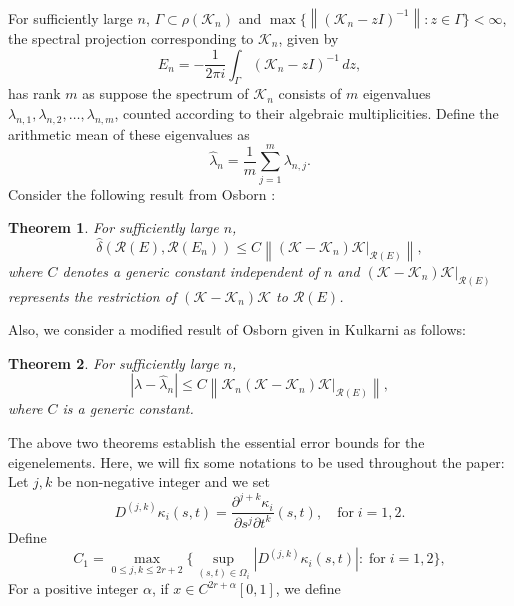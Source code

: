 \documentclass[pdflatex, sn-mathphys-num]{sn-jnl}%
\newcommand{\norm}[1]{\left\lVert #1\right\rVert}
\theoremstyle{thmstyleone}%
\newtheorem{theorem}{Theorem}[section]
\theoremstyle{thmstyletwo}%
\theoremstyle{thmstylethree}%
\begin{document}
For sufficiently large $n$,  $\Gamma \subset \rho(\mathcal{K}_n)$ and
$\max \{ \norm{(\mathcal{K}_n - zI)^{-1}} : z \in \Gamma \} < \infty$,
the spectral projection corresponding to $\mathcal{K}_n$, given by  
\[
E_n = -\frac{1}{2\pi i} \int_{\Gamma} (\mathcal{K}_n - zI)^{-1} \, dz,
\]
has rank $m$ as suppose the spectrum of $\mathcal{K}_n$ consists of $m$ eigenvalues $\lambda_{n,1}, \lambda_{n,2}, \ldots, \lambda_{n,m}$, counted according to their algebraic multiplicities. Define the arithmetic mean of these eigenvalues as  
\[
\hat{\lambda}_n = \frac{1}{m} \sum_{j=1}^m \lambda_{n,j}.
\]	
Consider the following result from Osborn \cite{Osborn}:
\begin{theorem} \label{th1}
	For sufficiently large $n$,  
	\[
	\hat{\delta}\left(\mathcal{R}(E), \mathcal{R}(E_n)\right) \leq C \norm{\left(\mathcal{K} - \mathcal{K}_n\right)\mathcal{K}|_{\mathcal{R}(E)}} ,
	\]
	where $C$ denotes a generic constant independent of $n$ and $\left( \mathcal{K} - \mathcal{K}_n \right)\mathcal{K}|_{\mathcal{R}(E)}$ represents the restriction of $(\mathcal{K} - \mathcal{K}_n)\mathcal{K}$ to $\mathcal{R}(E)$.
\end{theorem} 
\noindent
Also, we consider a modified result of Osborn \cite[Theorem 2]{Osborn} given in Kulkarni \cite [Theorem 2.2]{RPK6} as follows:
\begin{theorem} \label{th2}
	For sufficiently large $n$,  
	\[
	| \lambda - \hat{\lambda}_n | \leq C \norm{ \mathcal{K}_n(\mathcal{K} - \mathcal{K}_n)\mathcal{K}|_{\mathcal{R}(E)}},
	\]
	where $C$ is a generic constant.
\end{theorem}
\noindent
The above two theorems establish the essential error bounds for the eigenelements.
Here, we will fix some notations to be used throughout the paper:\\
Let $j, k$ be non-negative integer and we set
\begin{equation*}
	D^{(j,k)}\kappa_i(s,t)=\frac{\partial^{j+k}\kappa_i}{\partial s^j \partial t ^k} (s,t), \quad \text{for} \; i=1,2.	
\end{equation*}
Define
\begin{equation*}
	C_1= \max_{0 \le j, k \le {2r+2}}\bigg \{ \sup_{ (s,t) \in \Omega_i} \left| D^{(j,k)} \kappa_i(s,t)\right| : \; \text{for}\; i=1, 2\bigg \},
\end{equation*}  
For a positive integer $\alpha$, if $x \in C^{2r+\alpha}[0,1]$, we define
\end{document}
